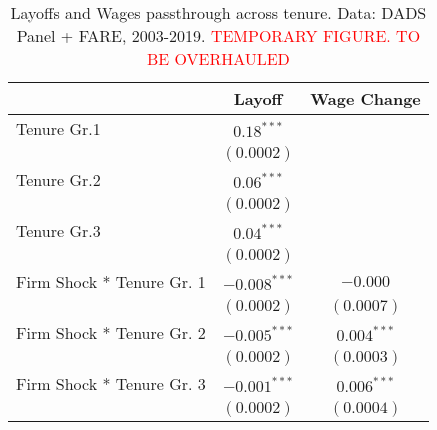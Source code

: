 \begin{table}
    \centering
    \label{tab:acrossfirms}
    \begin{tabular}{lcc}
    \hline
    & \multicolumn{1}{c}{Layoff} & \multicolumn{1}{c}{Wage Change} \\   
    \hline
    \vspace{-4pt} 
    Tenure Gr.1        &  $0.18^{***}$   &          \\    \vspace{-4pt} 
                        &  $(0.0002)$     &         \\    \vspace{-4pt} 
    Tenure Gr.2        &  $0.06^{***}$       &       \\    \vspace{-4pt} 
                        &  $(0.0002)$     &         \\    \vspace{-4pt} 
    Tenure Gr.3        &  $0.04^{***}$       &          \\    \vspace{-4pt} 
                        &  $(0.0002)$     &         \\    \vspace{-4pt} 
    Firm Shock * Tenure Gr. 1   & $-0.008^{***}$  &   $-0.000$  \\    \vspace{-4pt} 
                                &  $(0.0002)$     &    $(0.0007)$ \\    \vspace{-4pt} 
    Firm Shock * Tenure Gr. 2   & $-0.005^{***}$  &  $0.004^{***}$ \\    \vspace{-4pt} 
                                &  $(0.0002)$     &   $(0.0003)$      \\    \vspace{-4pt} 
    Firm Shock * Tenure Gr. 3   & $-0.001^{***}$  &  $0.006^{***}$ \\    \vspace{-4pt} 
                                &  $(0.0002)$     &  $(0.0004)$  \\   
    \hline
  \end{tabular}
  \caption{Layoffs and Wages passthrough across tenure. Data: DADS Panel + FARE, 2003-2019. \textcolor{red}{TEMPORARY FIGURE. TO BE OVERHAULED}}
\end{table}

